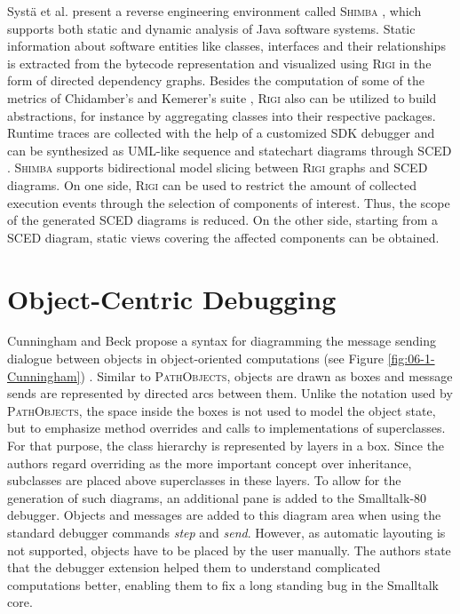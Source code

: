 Systä et al. present a reverse engineering environment called \textsc{Shimba} \cite{systa_shimba_2001}, which supports both static and dynamic analysis of Java software systems.
Static information about software entities like classes, interfaces and their relationships is extracted from the bytecode representation and visualized using \textsc{Rigi} \cite{muller_understanding_1993} in the form of directed dependency graphs.
Besides the computation of some of the metrics of Chidamber's and Kemerer's suite \cite{chidamber_metrics_1994}, \textsc{Rigi} also can be utilized to build abstractions, for instance by aggregating classes into their respective packages.
Runtime traces are collected with the help of a customized SDK debugger and can be synthesized as UML-like sequence and statechart diagrams through \textsc{SCED} \cite{koskimies_automated_1998,systa_understanding_2000}.
\textsc{Shimba} supports bidirectional model slicing between \textsc{Rigi} graphs and \textsc{SCED} diagrams.
On one side, \textsc{Rigi} can be used to restrict the amount of collected execution events through the selection of components of interest. Thus, the scope of the generated \textsc{SCED} diagrams is reduced.
On the other side, starting from a \textsc{SCED} diagram, static views covering the affected components can be obtained.


\section{Object-Centric Debugging}
Cunningham and Beck propose a syntax for diagramming the message sending dialogue between objects in object-oriented computations (see Figure \ref{fig:06-1-Cunningham}) \cite{cunningham_diagram_1986, beck_system_1989}.
Similar to \textsc{PathObjects}, objects are drawn as boxes and message sends are represented by directed arcs between them.
Unlike the notation used by \textsc{PathObjects}, the space inside the boxes is not used to model the object state, but to emphasize method overrides and calls to implementations of superclasses.
For that purpose, the class hierarchy is represented by layers in a box.
Since the authors regard overriding as the more important concept over inheritance, subclasses are placed above superclasses in these layers. 
To allow for the generation of such diagrams, an additional pane is added to the Smalltalk-80 debugger. 
Objects and messages are added to this diagram area when using the standard debugger commands \emph{step} and \emph{send}. 
However, as automatic layouting is not supported, objects have to be placed by the user manually. 
The authors state that the debugger extension helped them to understand complicated computations better, enabling them to fix a long standing bug in the Smalltalk core.

